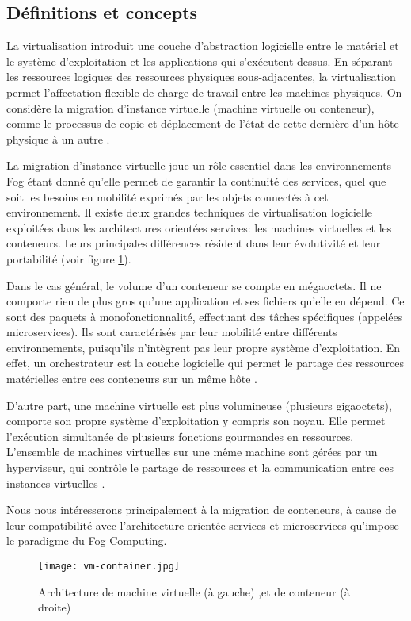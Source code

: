 \subsection{Définitions et concepts}
La virtualisation introduit une couche d'abstraction logicielle entre le matériel et le système d'exploitation et les applications qui s'exécutent dessus. En séparant les ressources logiques des ressources physiques sous-adjacentes, la virtualisation permet l'affectation flexible de charge de travail entre les machines physiques.
On considère la migration d'instance virtuelle (machine virtuelle ou conteneur), comme le processus de copie et déplacement de l'état de cette dernière d'un hôte physique à un autre \cite{boutaba2013}.\par
La migration d'instance virtuelle joue un rôle essentiel dans les environnements Fog étant donné qu'elle permet de garantir la continuité des services, quel que soit les besoins en mobilité exprimés par les objets connectés à cet environnement.
Il existe deux grandes techniques de virtualisation logicielle exploitées dans les architectures orientées services: les machines virtuelles et les conteneurs. Leurs principales différences résident dans leur évolutivité et leur portabilité \cite{redhat} (voir figure \ref{fig:vmvsconteneur}).\par
Dans le cas général, le volume d'un conteneur se compte en mégaoctets. Il ne comporte rien de plus gros qu'une application et ses fichiers qu'elle en dépend. Ce sont des paquets à monofonctionnalité, effectuant des tâches spécifiques (appelées microservices). Ils sont caractérisés par leur mobilité entre différents environnements, puisqu'ils n'intègrent pas leur propre système d'exploitation. En effet, un orchestrateur est la couche logicielle qui permet le partage des ressources matérielles entre ces conteneurs sur un même hôte \cite{redhat}.\par
D'autre part, une machine virtuelle est plus volumineuse (plusieurs gigaoctets), comporte son propre système d'exploitation y compris son noyau. Elle permet l'exécution simultanée de plusieurs fonctions gourmandes en ressources. L'ensemble de machines virtuelles sur une même machine sont gérées par un hyperviseur, qui contrôle le partage de ressources et la communication entre ces instances virtuelles \cite{microsoft2019}.\par
Nous nous intéresserons principalement à la migration de conteneurs, à cause de leur compatibilité avec l'architecture orientée services et microservices qu'impose le paradigme du Fog Computing.
\begin{figure}[H]
\centering
\texttt{[image: vm-container.jpg]}
\caption{Architecture de machine virtuelle (à gauche) ,et de conteneur (à droite) \cite{alibabacloud}}
\label{fig:vmvsconteneur}
\end{figure}

